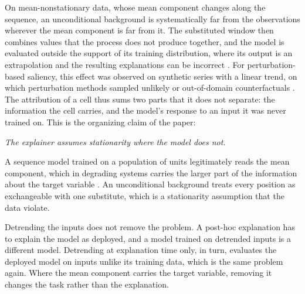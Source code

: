 \documentclass{article}
\begin{document}
On mean-nonstationary data, whose mean component changes along the sequence, an unconditional background is systematically far from the observations wherever the mean component is far from it. The substituted window then combines values that the process does not produce together, and the model is evaluated outside the support of its training distribution, where its output is an extrapolation \citep{hooker2021unrestricted} and the resulting explanations can be incorrect \citep{frye2021shapley}. For perturbation-based saliency, this effect was observed on synthetic series with a linear trend, on which perturbation methods sampled unlikely or out-of-domain counterfactuals \citep{tonekaboni2020went}. The attribution of a cell thus sums two parts that it does not separate: the information the cell carries, and the model's response to an input it was never trained on. This is the organizing claim of the paper:
\begin{center}
\itshape The explainer assumes stationarity where the model does not.
\end{center}
A sequence model trained on a population of units legitimately reads the mean component, which in degrading systems carries the larger part of the information about the target variable \citep{degradx2026}. An unconditional background treats every position as exchangeable with one substitute, which is a stationarity assumption that the data violate.

Detrending the inputs does not remove the problem. A post-hoc explanation has to explain the model as deployed, and a model trained on detrended inputs is a different model. Detrending at explanation time only, in turn, evaluates the deployed model on inputs unlike its training data, which is the same problem again. Where the mean component carries the target variable, removing it changes the task rather than the explanation.
\end{document}
